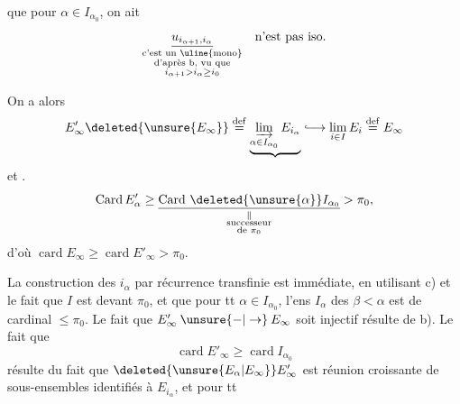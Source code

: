 
 que   pour  $\alpha\in I_{\alpha_0}$, on ait
\[
\underset{\substack{\text{c'est un \uline{mono}}\\\text{d'après b, vu que}\\i_{\alpha+1}>i_\alpha\geq i_0}}{\underline{u_{i_{\alpha+1},i_\alpha}}}\quad\text{n'est pas iso.}
\]

On a alors
\[
E'_\infty\deleted{\unsure{E_\infty}}\overset{\mathrm{def}}{=}\underbrace{\underset{\alpha\in I_{\alpha_0}}{\varinjlim}\,E_{i_\alpha}}\lhook\joinrel\longrightarrow
\underset{i\in I}{\lim}\,E_i\overset{\mathrm{def}}{=}E_\infty
\]
et .
\[
\operatorname{Card} E'_\alpha\geq\underset{\substack{\Vert\\\text{successeur}\\\text{de }\pi_0}}{\underline{\operatorname{Card}\,\deleted{\unsure{\alpha}}I_{\alpha_0}}}>\pi_0,
\]
d'où $\operatorname{card} E_\infty\geq\operatorname{card} E'_\infty>\pi_0$.

 La construction des $i_\alpha$ par récurrence transfinie est immédiate, en utilisant c) et le fait que $I$ est  devant $\pi_0$, et que pour tt $\alpha\in I_{\alpha_0}$, l'ens
$I_\alpha$ des  $\beta<\alpha$ est de cardinal $\leq\pi_0$. Le fait que $E'_\infty\mathbin{\unsure{-|\to}}E_\infty$ soit injectif résulte de b). Le fait que 
\[
\operatorname{card} E'_\infty\geq\operatorname{card} I_{\alpha_0}
\]
résulte du fait que $\deleted{\unsure{E_\alpha|E_\infty}}E'_\infty$ est réunion croissante de sous-ensembles identifiés à $E_{i_\alpha}$, et pour tt
